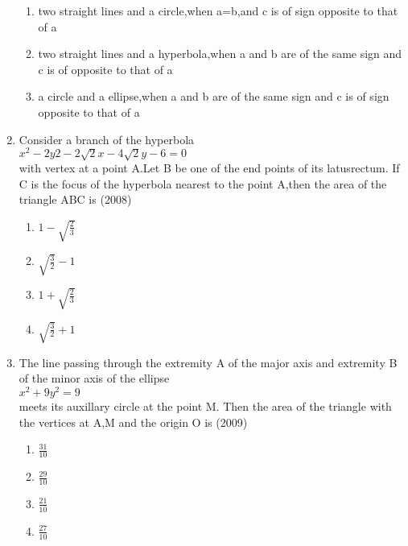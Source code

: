 \documentclass[journal,12pt,twocolumn]{IEEEtran}
\theoremstyle{remark}
\begin{document}
\begin{enumerate}
\begin{enumerate}
    \item two straight lines and a circle,when a=b,and c is of sign opposite to that of a\\
    \item two straight lines and a hyperbola,when a and b are of the same sign and c is of opposite to that of a\\
    \item a circle and a ellipse,when a and b are of the same sign and c is of sign opposite to that of a\\
\end{enumerate}
\item Consider a branch of the hyperbola\\$x^{2}-2y{2}-2\sqrt{2}x-4\sqrt{2}y-6=0$\\with vertex at a point A.Let B be one of the end points of its latusrectum. If C is the focus of the hyperbola nearest to the point A,then the area of the triangle ABC is \hfill{(2008)}
\begin{multicols}{4}
\begin{enumerate}
    \item $1-\sqrt{\frac{2}{3}}$
    \item $\sqrt{\frac{3}{2}}-1$
    \item $1+\sqrt{\frac{2}{3}}$
    \item $\sqrt{\frac{3}{2}}+1$
\end{enumerate}
\end{multicols}
\item The line passing through the extremity A of the major axis and extremity B of the minor axis of the ellipse\\$x^{2}+9y^{2}=9$\\meets its auxillary circle at the point M. Then the area of the triangle with the vertices at A,M and the origin O is \hfill{(2009)}
\begin{multicols}{4}
\begin{enumerate}
    \item $\frac{31}{10}$
    \item $\frac{29}{10}$
    \item $\frac{21}{10}$
    \item $\frac{27}{10}$
\end{enumerate}
\end{multicols}
\end{enumerate}
\end{document}
